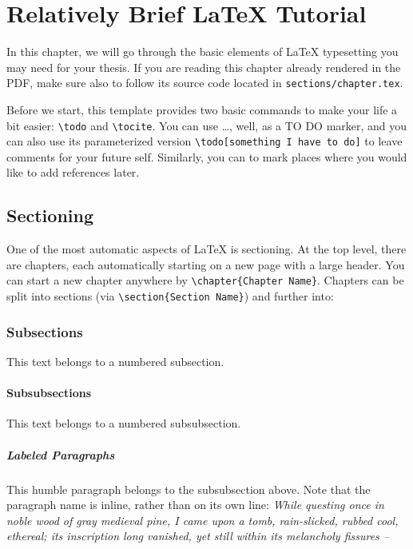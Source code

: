 \chapter{Relatively Brief \LaTeX{} Tutorial}
\label{ch:tutorial}

In this chapter, we will go through the basic elements of \LaTeX{} typesetting you may need for your thesis.
If you are reading this chapter already rendered in the PDF, make sure also to follow its source code located in
\verb|sections/chapter.tex|.

Before we start, this template provides two basic commands to make your life a bit easier: \verb|\todo| and
\verb|\tocite|. You can use \todo\dots, well, as a TO DO marker, and you can also use its parameterized version
\verb|\todo[something I have to do]| to leave comments for your future self. Similarly, you can \tocite to mark
places where you would like to add references later.


\section{Sectioning}
\label{sec:sectioning}

One of the most automatic aspects of \LaTeX{} is sectioning. At the top level, there are chapters, each
automatically starting on a new page with a large header. You can start a new chapter anywhere by
\verb|\chapter{Chapter Name}|. Chapters can be split into sections (via \verb|\section{Section Name}|) and further
into:

\subsection{Subsections}

This text belongs to a numbered subsection.

\subsubsection{Subsubsections}

This text belongs to a numbered subsubsection.

\paragraph{Labeled Paragraphs} This humble paragraph belongs to the subsubsection above. Note that the
paragraph name is inline, rather than on its own line: \emph{While questing once in noble wood of gray
medieval pine, I came upon a tomb, rain-slicked, rubbed cool, ethereal; its inscription long vanished,
yet still within its melancholy fissures --}

